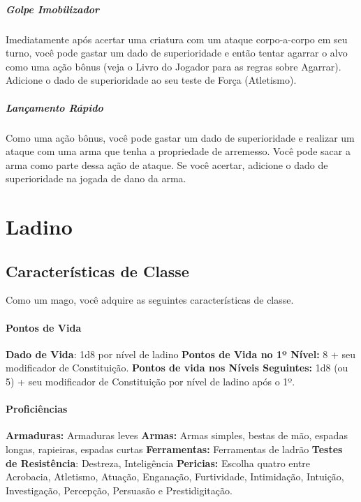 \documentclass{RPG_Adventure}[2021/10/20]
\begin{document}
\paragraph{Golpe Imobilizador} Imediatamente após acertar uma criatura com um
ataque corpo-a-corpo em seu turno, você pode gastar um dado de superioridade e
então tentar agarrar o alvo como uma ação bônus (veja o Livro do Jogador para as
regras sobre Agarrar). Adicione o dado de superioridade ao seu teste de Força
(Atletismo).

\paragraph{Lançamento Rápido} Como uma ação bônus, você pode gastar um dado de
superioridade e realizar um ataque com uma arma que tenha a propriedade de
arremesso. Você pode sacar a arma como parte dessa ação de ataque. Se você
acertar, adicione o dado de superioridade na jogada de dano da arma.


\chapter{Ladino}%
\label{cha:ladino}

\section*{Características de Classe}%

Como um mago, você adquire as seguintes características de classe.

\subsubsection{Pontos de Vida}%

\textbf{Dado de Vida}: 1d8 por nível de ladino \nl
\textbf{Pontos de Vida no 1º Nível:} 8 + seu modificador de Constituição. \nl
\textbf{Pontos de vida nos Níveis Seguintes:} 1d8 (ou 5) + seu modificador de
Constituição por nível de ladino após o 1º.

\subsubsection{Proficiências}%

\textbf{Armaduras:} Armaduras leves \nl
\textbf{Armas:} Armas simples, bestas de mão, espadas longas, rapieiras, espadas
curtas\nl
\textbf{Ferramentas:} Ferramentas de ladrão \jump
\textbf{Testes de Resistência}: Destreza, Inteligência \nl
\textbf{Pericias:} Escolha quatro entre Acrobacia, Atletismo, Atuação,
Enganação, Furtividade, Intimidação, Intuição, Investigação, Percepção,
Persuasão e Prestidigitação.
\end{document}
